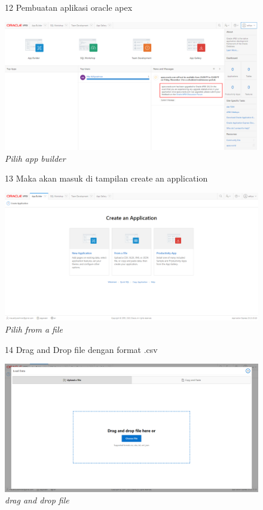 \begin{enumerate}
\begin{figure}[!htbp]
\item[12] Pembuatan aplikasi oracle apex
	\begin{center}
	\includegraphics[scale=0.2]{figures/tahap10.png}
	\caption{\textit{Pilih app builder}}
	\end{center}	 
\end{figure}

\begin{figure}[!htbp]
\item[13] Maka akan masuk di tampilan create an application
	\begin{center}
	\includegraphics[scale=0.2]{figures/tahap12.png}
	\caption{\textit{Pilih from a file}}
	\end{center}	 
\end{figure}

\begin{figure}[!htbp]
\item[14] Drag and Drop file dengan format .csv
	\begin{center}
	\includegraphics[scale=0.2]{figures/tahap13.png}
	\caption{\textit{drag and drop file}}
	\end{center}	 
\end{figure}


\end{enumerate}
